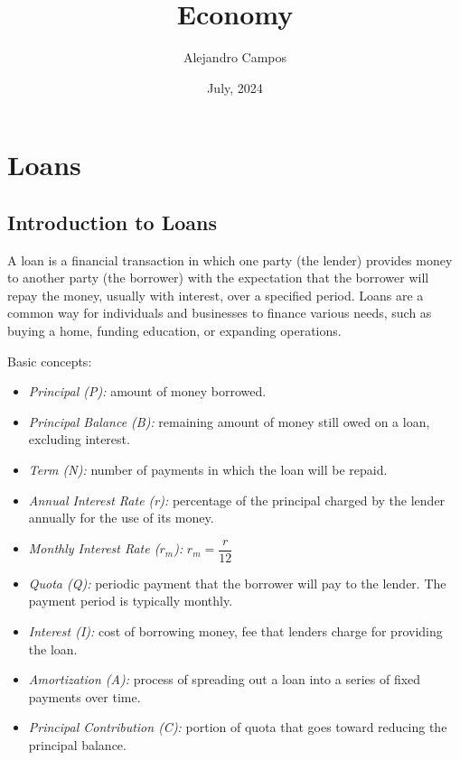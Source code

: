 \documentclass{article}
\title{\textbf{Economy}}
\author{Alejandro Campos}
\date{July, 2024}
\begin{document}
\maketitle
\newpage
\tableofcontents

\newpage
\section{Loans}

\subsection{Introduction to Loans}
A loan is a financial transaction in which one party (the lender) provides money to another party (the borrower) with the expectation that the borrower will repay the money, usually with interest, over a specified period. Loans are a common way for individuals and businesses to finance various needs, such as buying a home, funding education, or expanding operations.

Basic concepts:

\begin{itemize}
    \item \textit{Principal (P):} amount of money borrowed.
    \item \textit{Principal Balance (B):} remaining amount of money still owed on a loan, excluding interest.
    \item \textit{Term (N):} number of payments in which the loan will be repaid.
    \item \textit{Annual Interest Rate (r):} percentage of the principal charged by the lender annually for the use of its money.
    \item \textit{Monthly Interest Rate ($r_m$):} $r_m = \dfrac{r}{12}$
    \item \textit{Quota (Q):} periodic payment that the borrower will pay to the lender. The payment period is typically monthly.
    \item \textit{Interest (I):} cost of borrowing money,  fee that lenders charge for providing the loan.
    \item \textit{Amortization (A):} process of spreading out a loan into a series of fixed payments over time.
    \item \textit{Principal Contribution (C):} portion of quota that goes toward reducing the principal balance.
\end{itemize}
\end{document}
